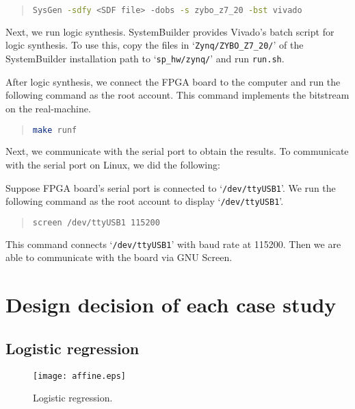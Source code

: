 \begin{quote}
\begin{lstlisting}[language=bash, numbers=none, frame=l]
SysGen -sdfy <SDF file> -dobs -s zybo_z7_20 -bst vivado
\end{lstlisting}
\end{quote}

Next, we run logic synthesis. SystemBuilder provides Vivado's batch script for logic synthesis. To use this, copy the files in `\texttt{Zynq/ZYBO\_Z7\_20/}' of the SystemBuilder installation path to `\texttt{sp\_hw/zynq/}' and run \texttt{run.sh}.

After logic synthesis, we connect the FPGA board to the computer and run the following command as the root account. This command implements the bitstream on the real-machine.

\begin{quote}
  \begin{lstlisting}[language=bash, numbers=none, frame=l]
make runf
  \end{lstlisting}
\end{quote}

Next, we communicate with the serial port to obtain the results. To communicate with the serial port on Linux, we did the following:

Suppose FPGA board's serial port is connected to `\texttt{/dev/ttyUSB1}'. We run the following command as the root account to display `\texttt{/dev/ttyUSB1}'.

\begin{quote}
  \begin{lstlisting}[language=bash, numbers=none, frame=l]
screen /dev/ttyUSB1 115200
  \end{lstlisting}
\end{quote}

This command connects `\texttt{/dev/ttyUSB1}' with baud rate at 115200.
Then we are able to communicate with the board via GNU Screen.


\section{Design decision of each case study} \label{sec:design_case_study}
\subsection{Logistic regression} \label{sec:logistic_regerssion}

\begin{figure}[tb]
  \center
  \texttt{[image: affine.eps]}
  \caption{Logistic regression.}
  \label{fig:affine}
\end{figure}

